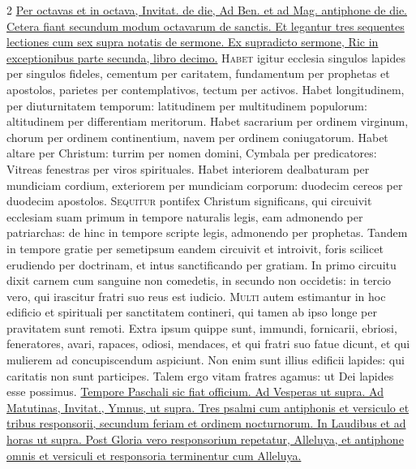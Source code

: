 \begin{multicols*}{2}
\newline \ul{Per octavas et in octava, Invitat. de die, Ad Ben. et ad Mag. antiphone de die. Cetera fiant secundum modum octavarum de sanctis. Et legantur tres sequentes lectiones cum sex supra notatis de sermone. Ex supradicto sermone, Ric in exceptionibus parte secunda, libro decimo.}
 \grecross
\lettrine[lines=2]{\zallmancaps \color{Blue} H}{abet} igitur ecclesia singulos lapides per singulos fideles, cementum per caritatem, fundamentum per prophetas et apostolos, parietes per contemplativos, tectum per activos. Habet longitudinem, per diuturnitatem temporum: latitudinem per multitudinem populorum: altitudinem per differentiam meritorum. Habet sacrarium per ordinem virginum, chorum per ordinem continentium, navem per ordinem coniugatorum. Habet altare per Christum: turrim per nomen domini, Cymbala per predicatores: Vitreas fenestras per viros spirituales. Habet interiorem dealbaturam per mundiciam cordium, exteriorem per mundiciam corporum: duodecim cereos per duodecim apostolos.
\lettrine[lines=2]{\zallmancaps \color{Red} S}{equitur} pontifex Christum significans, qui circuivit ecclesiam suam primum in tempore naturalis legis, eam admonendo per patriarchas: de hinc in tempore scripte legis, admonendo per prophetas. Tandem in tempore gratie per semetipsum eandem circuivit et introivit, foris scilicet erudiendo per doctrinam, et intus sanctificando per gratiam. In primo circuitu dixit carnem cum sanguine non comedetis, in secundo non occidetis: in tercio vero, qui irascitur fratri suo reus est iudicio.
\lettrine[lines=2]{\zallmancaps \color{Blue} M}{ulti} autem estimantur in hoc edificio et spirituali per sanctitatem contineri, qui tamen ab ipso longe per pravitatem sunt remoti. Extra ipsum quippe sunt, immundi, fornicarii, ebriosi, feneratores, avari, rapaces, odiosi, mendaces, et qui fratri suo fatue dicunt, et qui mulierem ad concupiscendum aspiciunt. Non enim sunt illius edificii lapides: qui caritatis non sunt participes. Talem ergo vitam fratres agamus: ut Dei lapides esse possimus.
\newline \ul{Tempore Paschali sic fiat officium. Ad Vesperas ut supra. Ad Matutinas, Invitat., Ymnus, ut supra. Tres psalmi cum antiphonis et versiculo et tribus responsorii, secundum feriam et ordinem nocturnorum. In Laudibus et ad horas ut supra. Post Gloria vero responsorium repetatur, Alleluya, et antiphone omnis et versiculi et responsoria terminentur cum Alleluya.}


\end{multicols*}
